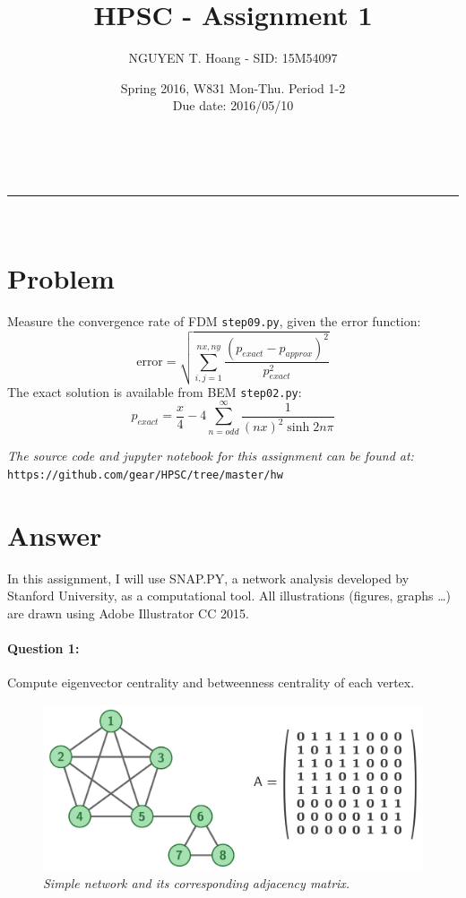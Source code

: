 \documentclass[a4paper,12pt]{article}
\makeatletter
\newcommand{\linia}{\rule{\linewidth}{0.5pt}}
\renewcommand{\maketitle} {%
\begin{center}
\vspace{2ex}
{\huge \textsc{\@title}}
\vspace{1ex}
\\
\linia\\
\@author \hfill \@date
\vspace{4ex}
\end{center}
}
\makeatother
\begin{document}

\title{HPSC - Assignment 1}

\author{NGUYEN T. Hoang - SID: 15M54097}

\date{Spring 2016, W831 Mon-Thu. Period 1-2 \\ \hfill Due date: 2016/05/10}

\maketitle

\vspace{2em}
\section*{Problem}
\noindent
Measure the convergence rate of FDM \texttt{step09.py}, given the error function:
$$ \mbox{error} = \sqrt{\sum_{i,j=1}^{nx,ny}\frac{(p_{exact} - p_{approx})^2}{p_{exact}^2}} $$
The exact solution is available from BEM \texttt{step02.py}:
$$ p_{exact} = \frac{x}{4} - 4 \sum_{n=odd}^{\infty} \frac{1}{(nx)^2\sinh{2n\pi}} $$

\vspace{1.5em}
\noindent
\emph{The source code and jupyter notebook for this assignment can be found at:} \\
\texttt{https://github.com/gear/HPSC/tree/master/hw}
\pagebreak
\section*{Answer}

\noindent
In this assignment, I will use SNAP.PY, a network analysis developed by Stanford University, as a computational tool. All illustrations (figures, graphs \ldots) are drawn using Adobe Illustrator CC 2015.

\paragraph{Question 1:} Compute eigenvector centrality and betweenness centrality of each vertex.

\begin{figure}[h]
    \includegraphics[width=\textwidth]{cn_a2_net}
    \caption{\emph{Simple network and its corresponding adjacency matrix.}}
    \label{fig:net}
\end{figure}
\end{document}
